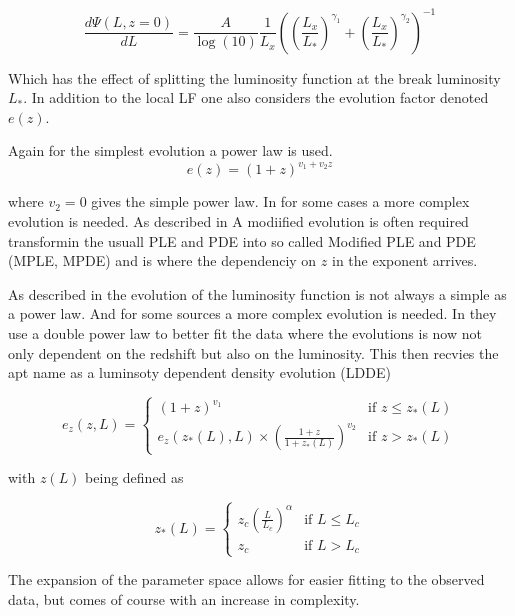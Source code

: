 \documentclass{article}
\begin{document}
\begin{equation}
    \frac{d\Psi(L,z=0)}{dL} =  \frac{A}{\log(10)} \frac{1}{L_x} \left( \left( \frac{L_x}{L_*} \right)^{\gamma_1} + \left( \frac{L_x}{L_*} \right)^{\gamma_2} \right)^{-1}
\end{equation}

Which has the effect of splitting the luminosity function at the break luminosity $L_*$.
In addition to the local LF one also considers the evolution factor denoted $e(z)$. 

Again for the simplest evolution a power law is used.
 $$
e(z) = (1 + z)^{v_1 + v_2 z}
 $$

 where $v_2 = 0$ gives the simple power law. In for some cases a more complex evolution is needed. As described in 
 \cite{Ajello_2009} A modiified evolution is often required transformin the usuall PLE and PDE into so called
 Modified PLE and PDE (MPLE, MPDE) and is where the dependenciy on $z$ in the exponent arrives. 

 As described in \cite{Ueda_2003} the evolution of the luminosity function is not always a simple as a power law.
 And for some sources a more complex evolution is needed. In \cite{Ueda_2003} they use a double power law to better fit the data where 
 the evolutions is now not only dependent on the redshift but also on the luminosity. This then recvies the apt name as a luminsoty dependent density evolution (LDDE)


 \begin{equation}
    e_z(z, L) = 
    \begin{cases} 
    (1 + z)^{v_1} & \text{if } z \leq z_*(L) \\
    e_z(z_*(L), L) \times \left( \frac{1 + z}{1 + z_*(L)} \right)^{v_2} & \text{if } z >  z_*(L)
    \end{cases}
 \end{equation}

 with $z(L)$ being defined as

 \begin{equation}
    z_*(L) = 
    \begin{cases} 
    z_c \left( \frac{L}{L_c} \right)^\alpha & \text{if } L \leq L_c \\
    z_c & \text{if } L > L_c 
    \end{cases}
 \end{equation}


 The expansion of the parameter space allows for easier fitting to the observed data, but comes of course with an increase in complexity. 
\end{document}
